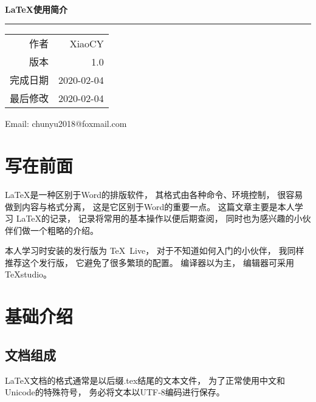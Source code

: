 \documentclass{ctexart}
\begin{document}
	
	\begin{titlepage}
		\ %
		
		\vspace{\fill}
		
		\begin{flushright}
			{\Huge\bfseries\LaTeX 使用简介} \\
			\rule[1em]{\linewidth}{0.5ex}
			
			\begin{tabular}{rr}
				作者 & XiaoCY \\
				版本 & 1.0 \\
				完成日期 & 2020-02-04 \\
				最后修改 & 2020-02-04
			\end{tabular}
		\end{flushright}
		
		
		{\noindent Email: chunyu2018@foxmail.com}
	\end{titlepage}

	\tableofcontents
	\clearpage
	
	\section{写在前面}
	\LaTeX 是一种区别于Word的排版软件，
	其格式由各种命令、环境控制，
	很容易做到内容与格式分离，
	这是它区别于Word的重要一点。
	这篇文章主要是本人学习 \LaTeX 的记录\cite{liuhaiyang}，
	记录将常用的基本操作以便后期查阅，
	同时也为感兴趣的小伙伴们做一个粗略的介绍。
	
	本人学习时安装的发行版为 \TeX~Live，		%
	对于不知道如何入门的小伙伴，
	我同样推荐这个发行版，
	它避免了很多繁琐的配置。
	编译器以\XeLaTeX 为主，
	编辑器可采用TeXstudio。
	
	\section{基础介绍}
	\subsection{文档组成}
	\LaTeX 文档的格式通常是以后缀.tex结尾的文本文件，
	为了正常使用中文和Unicode的特殊符号，
	务必将文本以UTF-8编码进行保存。
	
\end{document}
